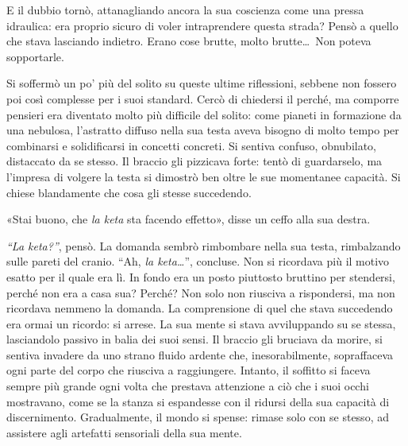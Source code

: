 E il dubbio tornò, attanagliando ancora la sua coscienza come una pressa idraulica: era proprio sicuro di voler intraprendere questa strada? Pensò a quello che stava lasciando indietro. Erano cose brutte, molto brutte\ldots\ Non poteva sopportarle.

Si soffermò un po' più del solito su queste ultime riflessioni, sebbene non fossero poi così complesse per i suoi standard. Cercò di chiedersi il perché, ma comporre pensieri era diventato molto più difficile del solito: come pianeti in formazione da una nebulosa, l'astratto diffuso nella sua testa aveva bisogno di molto tempo per combinarsi e solidificarsi in concetti concreti. Si sentiva confuso, obnubilato, distaccato da se stesso. Il braccio gli pizzicava forte: tentò di guardarselo, ma l'impresa di volgere la testa si dimostrò ben oltre le sue momentanee capacità. Si chiese blandamente che cosa gli stesse succedendo.

«Stai buono, che \textit{la keta} sta facendo effetto», disse un ceffo alla sua destra.

\textit{``La keta?''}, pensò. La domanda sembrò rimbombare nella sua testa, rimbalzando sulle pareti del cranio. ``Ah, \textit{la keta\ldots}'', concluse. Non si ricordava più il motivo esatto per il quale era lì. In fondo era un posto piuttosto bruttino per stendersi, perché non era a casa sua? Perché? Non solo non riusciva a rispondersi, ma non ricordava nemmeno la domanda. La comprensione di quel che stava succedendo era ormai un ricordo: si arrese. La sua mente si stava avviluppando su se stessa, lasciandolo passivo in balia dei suoi sensi. Il braccio gli bruciava da morire, si sentiva invadere da uno strano fluido ardente che, inesorabilmente, sopraffaceva ogni parte del corpo che riusciva a raggiungere. Intanto, il soffitto si faceva sempre più grande ogni volta che prestava attenzione a ciò che i suoi occhi mostravano, come se la stanza si espandesse con il ridursi della sua capacità di discernimento. Gradualmente, il mondo si spense: rimase solo con se stesso, ad assistere agli artefatti sensoriali della sua mente.
